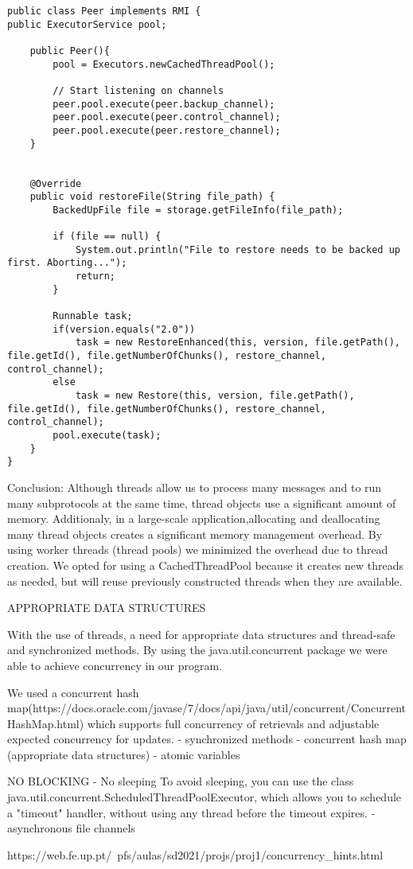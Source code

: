 \documentclass[11pt]{report}
\begin{document}
\begin{verbatim}
public class Peer implements RMI {
public ExecutorService pool;

    public Peer(){
        pool = Executors.newCachedThreadPool();
        
        // Start listening on channels
        peer.pool.execute(peer.backup_channel);
        peer.pool.execute(peer.control_channel);
        peer.pool.execute(peer.restore_channel);
    }
    

    @Override
    public void restoreFile(String file_path) {
        BackedUpFile file = storage.getFileInfo(file_path);

        if (file == null) {
            System.out.println("File to restore needs to be backed up first. Aborting...");
            return;
        }

        Runnable task;
        if(version.equals("2.0"))
            task = new RestoreEnhanced(this, version, file.getPath(), file.getId(), file.getNumberOfChunks(), restore_channel, control_channel);
        else
            task = new Restore(this, version, file.getPath(), file.getId(), file.getNumberOfChunks(), restore_channel, control_channel);
        pool.execute(task);
    }
}
\end{verbatim}

Conclusion: 
Although threads allow us to process many messages and to run many subprotocols at the same time, thread objects use a significant amount of memory. Additionaly, in a large-scale application,allocating and deallocating many thread objects creates a significant memory management overhead. By using worker threads (thread pools) we minimized the overhead due to thread creation. We opted for using a CachedThreadPool because it creates new threads as needed, but will reuse previously constructed threads when they are available.

APPROPRIATE DATA STRUCTURES

With the use of threads, a need for appropriate data structures and thread-safe and synchronized methods. By using the java.util.concurrent package we were able to achieve concurrency in our program. 

We used a concurrent hash map(https://docs.oracle.com/javase/7/docs/api/java/util/concurrent/ConcurrentHashMap.html) which supports full concurrency of retrievals and adjustable expected concurrency for updates. 
- synchronized methods
- concurrent hash map (appropriate data structures)
- atomic variables


NO BLOCKING
- No sleeping
To avoid sleeping, you can use the class java.util.concurrent.ScheduledThreadPoolExecutor, which allows you to schedule a "timeout" handler, without using any thread before the timeout expires.
- asynchronous file channels

https://web.fe.up.pt/~pfs/aulas/sd2021/projs/proj1/concurrency\_hints.html
\end{document}
